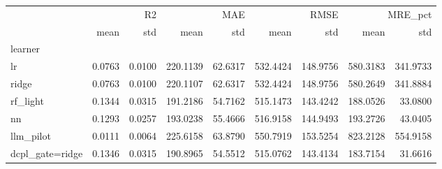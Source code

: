\begin{tabular}{lrrrrrrrr}
\toprule
 & \multicolumn{2}{r}{R2} & \multicolumn{2}{r}{MAE} & \multicolumn{2}{r}{RMSE} & \multicolumn{2}{r}{MRE\_pct} \\
 & mean & std & mean & std & mean & std & mean & std \\
learner &  &  &  &  &  &  &  &  \\
\midrule
lr & 0.0763 & 0.0100 & 220.1139 & 62.6317 & 532.4424 & 148.9756 & 580.3183 & 341.9733 \\
ridge & 0.0763 & 0.0100 & 220.1107 & 62.6317 & 532.4424 & 148.9756 & 580.2649 & 341.8884 \\
rf\_light & 0.1344 & 0.0315 & 191.2186 & 54.7162 & 515.1473 & 143.4242 & 188.0526 & 33.0800 \\
nn & 0.1293 & 0.0257 & 193.0238 & 55.4666 & 516.9158 & 144.9493 & 193.2726 & 43.0405 \\
llm\_pilot & 0.0111 & 0.0064 & 225.6158 & 63.8790 & 550.7919 & 153.5254 & 823.2128 & 554.9158 \\
dcpl\_gate=ridge & 0.1346 & 0.0315 & 190.8965 & 54.5512 & 515.0762 & 143.4134 & 183.7154 & 31.6616 \\
\bottomrule
\end{tabular}
